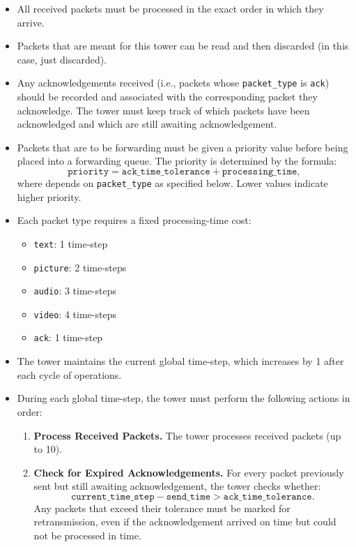 \documentclass[12pt]{report}
\begin{document}
\begin{itemize}

\item All received packets must be processed in the exact order in which they arrive.

\item Packets that are meant for this tower can be read and then discarded (in this case, just discarded).

\item Any acknowledgements received (i.e., packets whose \texttt{packet\_type} is \texttt{ack}) should be recorded and associated with the corresponding packet they acknowledge. The tower must keep track of which packets have been acknowledged and which are still awaiting acknowledgement.

\item Packets that are to be forwarding must be given a priority value before being placed into a forwarding queue.  
The priority is determined by the formula:
\[
  \texttt{priority} = \texttt{ack\_time\_tolerance} + \texttt{processing\_time},
\]
where  depends on \texttt{packet\_type} as specified below. Lower values indicate higher priority.

    \item Each packet type requires a fixed processing-time cost:
    \begin{itemize}
        \item \texttt{text}: 1 time-step
        \item \texttt{picture}: 2 time-steps
        \item \texttt{audio}: 3 time-steps
        \item \texttt{video}: 4 time-steps
        \item \texttt{ack}: 1 time-step
    \end{itemize}
    
    \item The tower maintains the current global time-step, which increases by 1 after each cycle of operations.

    \item During each global time-step, the tower must perform the following actions in order:

    \begin{enumerate}
        \item \textbf{Process Received Packets.}  
              The tower processes received packets (up to 10).

        \item \textbf{Check for Expired Acknowledgements.}  
              For every packet previously sent but still awaiting acknowledgement, the tower checks whether:
              \[
                  \texttt{current\_time\_step} - \texttt{send\_time} > \texttt{ack\_time\_tolerance}.
              \]
              Any packets that exceed their tolerance must be marked for retransmission, even if the acknowledgement arrived on time but could not be processed in time.


\end{enumerate}
\end{itemize}
\end{document}
